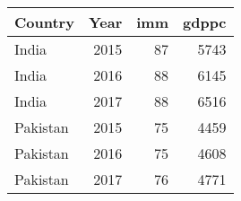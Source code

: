 \begin{tabular}{lrrr}
\toprule
Country & Year & imm & gdppc \\
\midrule
India&2015&87&5743\\
India&2016&88&6145\\
India&2017&88&6516\\
Pakistan&2015&75&4459\\
Pakistan&2016&75&4608\\
Pakistan&2017&76&4771\\
\bottomrule
\end{tabular}
